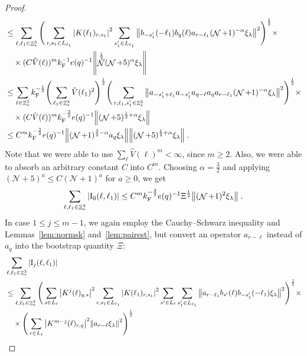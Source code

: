 \documentclass[12pt,a4paper]{article}
\numberwithin{equation}{section}
\newcommand{\cN}{\mathcal{N}}
\newcommand{\1}{\mathbb{I}}
\newcommand{\F}{\mathrm{F}}
\newcommand{\I}{\mathrm{I}}
\DeclareMathOperator{\Z}{\mathbb{Z}}
\DeclareMathOperator{\NN}{\mathcal{N}}
\newcommand{\half}{\frac{1}{2}}
\theoremstyle{plain}
\theoremstyle{definition}
\theoremstyle{remark}
\theoremstyle{plain}
\theoremstyle{definition}
\theoremstyle{remark}
\begin{document}
\begin{proof}
{\begin{align}
	&\leq \sum_{\ell,\ell_1 \in \Z^3_*} \Bigg( \sum\limits_{r,s_1 \in L_{\ell_1}}\abs{K(\ell_1)_{r,s_1}}^2 \sum\limits_{s_1' \in L_{\ell_1}} \norm{ b_{-s_1'}(-\ell_1) b_{q}(\ell) a_{r-\ell_1} (\NN+1)^{-\alpha}\xi_\lambda}^2\Bigg)^\half \times\nonumber\\
	& \quad \times (C \hat{V}(\ell))^m k_{\F}^{-1} e(q)^{-1} \norm{ \NN^\half(\NN+5)^{\alpha}\xi_\lambda } \nonumber\\
	&\leq \sum_{\ell \in \Z^3_*} k_{\F}^{-\half} \Bigg( \sum_{\ell_1 \in \Z^3_*} \hat{V}(\ell_1)^2 \Bigg)^{\half}
		\Bigg( \sum_{r,\ell_1,s_1' \in \Z^3_*}
		\norm{ a_{-s_1'+\ell_1} a_{-s_1'} a_{q-\ell} a_q a_{r-\ell_1} (\NN+1)^{-\alpha}\xi_\lambda}^2\Bigg)^\half \times\nonumber\\
	& \quad \times (C \hat{V}(\ell))^m k_{\F}^{-\frac 32} e(q)^{-1} \norm{ (\NN+5)^{\half + \alpha}\xi_\lambda } \nonumber\\
	&\leq C^m k_{\F}^{-\frac 32} e(q)^{-1}
		\norm{ (\NN+1)^{\frac 32-\alpha} a_q \xi_\lambda} \norm{ (\NN+5)^{\half+\alpha}\xi_\lambda } \nonumber \;.\\
\end{align}
Note that we were able to use $ \sum_\ell \hat{V}(\ell)^m < \infty $, since $ m \ge 2 $. Also, we were able to absorb an arbitrary constant $ C $ into $ C^m $. Choosing $\alpha = \frac 32$ and applying $ (\cN+5)^a \le C (\cN+1)^a $ for $ a \ge 0 $, we get
\begin{equation}
	 \sum_{\ell,\ell_1 \in \Z^3_*} |\I_0(\ell, \ell_1)|
	 \leq C^m k_{\F}^{-\frac 32} e(q)^{-1} \Xi^\half
	 	\norm { (\NN+1)^2 \xi_\lambda } \;. \label{eq:estEQ1111} 
\end{equation}
}
In case $ 1 \le j \le m-1 $, we again employ the Cauchy--Schwarz inequality and Lemmas~\ref{lem:normsk} and~\ref{lem:pairest}, but convert an operator $ a_{r-\ell} $ instead of $ a_q $ into the bootstrap quantity $ \Xi $:
\textcolor{green!30!black}{
\begin{align}
	&\sum_{\ell,\ell_1 \in \Z^3_*} |\I_j(\ell, \ell_1)| \nonumber\\
	&\leq \sum_{\ell,\ell_1 \in \Z^3_*} \Bigg( \sum\limits_{s \in L_\ell} \abs{K^j(\ell)_{q,s}}^2
		\sum\limits_{r, s_1 \in L_{\ell_1}} \abs{K(\ell_1)_{r,s_1}}^2
		\sum\limits_{s' \in L_\ell} \sum\limits_{s_1' \in L_{\ell_1}} \norm{a_{r-\ell_1} b_{s'}(\ell) b_{-s_1'}(-\ell_1) \xi_\lambda}^2 \Bigg)^\half \times \nonumber\\
	&\quad \times \Bigg( \sum\limits_{r\in L_{\ell}} \abs{K^{m-j}(\ell)_{r,q}}^2 \norm{a_{r-\ell} \xi_\lambda }^2 \Bigg)^\half\nonumber\\

\end{align}}
\end{proof}
\end{document}
